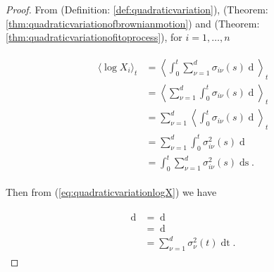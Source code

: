 \documentclass[british]{amsart}
\numberwithin{equation}{section}
\numberwithin{figure}{section}
\theoremstyle{plain}
\theoremstyle{definition}
\theoremstyle{plain}
\theoremstyle{plain}
\theoremstyle{plain}
\theoremstyle{remark}
\theoremstyle{plain}
\renewcommand{\d}[1]{\mathop{\mathrm{d}{#1}}}
\newcommand{\rangei}{i=1,\dots,n}
\begin{document}
\begin{proof} 

  From (Definition: \ref{def:quadraticvariation}), (Theorem:
\ref{thm:quadraticvariationofbrownianmotion}) and (Theorem:
\ref{thm:quadraticvariationofitoprocess}), for $\rangei$

  \begin{gather} \begin{split} \label{eq:quadraticvariationlogX} \langle
\log{X_{i}} \rangle_{t} & = \left< \int_{0}^{t} \sum_{\nu=1}^{d}
\sigma_{i\nu}(s) \d{W_{\nu}(s)} \right>_{t} \\ & = \left< \sum_{\nu=1}^{d}
\int_{0}^{t} \sigma_{i\nu}(s) \d{W_{\nu}(s)} \right>_{t} \\ & = \sum_{\nu=1}^{d}
\left< \int_{0}^{t} \sigma_{i\nu}(s) \d{W_{\nu}(s)} \right>_{t} \\ & =
\sum_{\nu=1}^{d} \int_{0}^{t} \sigma_{i\nu}^{2}(s) \d{\langle W_{\nu}(s) \rangle
} \\ & = \int_{0}^{t} \sum_{\nu=1}^{d} \sigma_{i\nu}^{2}(s) \d{s}. \end{split}
\end{gather}
  
  Then from (\ref{eq:quadraticvariationlogX}) we have
  
  \begin{gather} \begin{split} \d{\langle \log{X} \rangle_{t}} & =
\d{\left<\int_{0}^{t} \sum_{\nu=1}^{d} \sigma_{\nu}(s)
\d{W_{\nu}(s)}\right>_{t}}\\ & = \d{\left(\int_{0}^{t} \sum_{\nu=1}^{d}
\sigma_{\nu}^{2}(s) \d{s}\right)} \\ & = \sum_{\nu=1}^{d} \sigma_{\nu}^{2}(t)
\d{t}. \end{split} \end{gather}

\end{proof}
\end{document}
